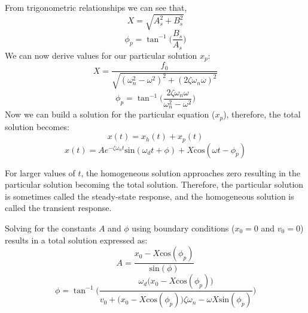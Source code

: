 \documentclass[12pt,letter]{article}
\begin{document}
	From trigonometric relationships we can see that, 
	\begin{equation}
		X = \sqrt{A_s^2 + B_s^2}
	\end{equation}	
	\begin{equation}
		\phi_p = \tan^{-1}\bigg(\frac{B_s}{A_s}\bigg)
	\end{equation}	
	We can now derive values for our particular solution $x_p$:
	\begin{equation}
		X = \frac{f_0}{\sqrt{(\omega_n^2 - \omega^2)^2 +  (2\zeta \omega_n \omega)^2}} 
		\label{eq:X_damped}
	\end{equation}	
	\begin{equation}
		\phi_p = \tan^{-1} \bigg(\frac{2\zeta \omega_n \omega}{\omega_n^2 - \omega^2}\bigg)
	\end{equation}				
	Now we can build a solution for the particular equation ($x_p$), therefore, the total solution becomes:
	\begin{equation}
		x(t) = x_h(t) + x_p(t)
	\end{equation}
	\begin{equation}
		x(t) = Ae^{-\zeta \omega_n t}\text{sin}(\omega_d t + \phi) +  X \text{cos}(\omega t - \phi_p)
	\end{equation}				
	
	\begin{note}
	For larger values of $t$, the homogeneous solution approaches zero resulting in the particular solution becoming the total solution. Therefore, the particular solution is sometimes called the steady-state response, and the homogeneous solution is called the transient response. 
	\end{note}

	Solving for the constants $A$ and $\phi$ using boundary conditions ($x_0=0$ and $v_0=0$) results in a total solution expressed as:
	\begin{equation}
		A = \frac{x_0 -X \text{cos}(\phi_p)}{\text{sin}(\phi)}
	\end{equation}			 
	\begin{equation}
		\phi =  \tan^{-1} \bigg(\frac{\omega_d \big( x_0 -X \text{cos}(\phi_p)\big)}{v_0 + \big(x_0 - X \text{cos}(\phi_p)\big) \zeta \omega_n - \omega X \text{sin}(\phi_p) }\bigg)
	\end{equation}			
\end{document}

